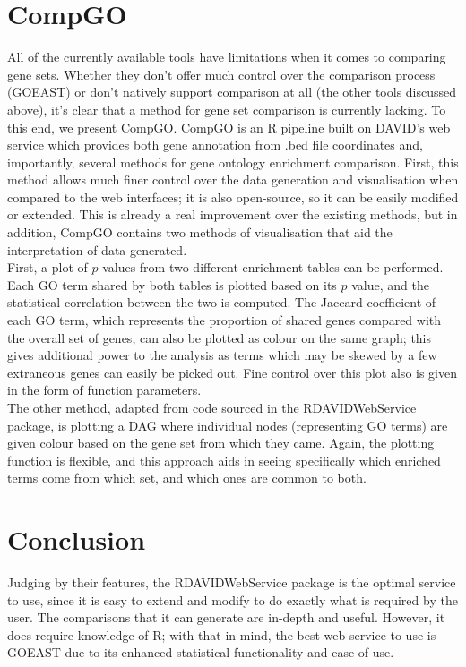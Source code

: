 \documentclass[11pt, oneside]{article}
\begin{document}
\section*{CompGO}
All of the currently available tools have limitations when it comes to comparing gene sets. Whether they don't offer much control over the comparison process (GOEAST) or don't natively support comparison at all (the other tools discussed above), it's clear that a method for gene set comparison is currently lacking. To this end, we present CompGO. CompGO is an R pipeline built on DAVID's web service which provides both gene annotation from .bed file coordinates and, importantly, several methods for gene ontology enrichment comparison. First, this method allows much finer control over the data generation and visualisation when compared to the web interfaces; it is also open-source, so it can be easily modified or extended. This is already a real improvement over the existing methods, but in addition, CompGO contains two methods of visualisation that aid the interpretation of data generated.\\
First, a plot of $p$ values from two different enrichment tables can be performed. Each GO term shared by both tables is plotted based on its $p$ value, and the statistical correlation between the two is computed. The Jaccard coefficient of each GO term, which represents the proportion of shared genes compared with the overall set of genes, can also be plotted as colour on the same graph; this gives additional power to the analysis as terms which may be skewed by a few extraneous genes can easily be picked out. Fine control over this plot also is given in the form of function parameters.\\
The other method, adapted from code sourced in the RDAVIDWebService package, is plotting a DAG where individual nodes (representing GO terms) are given colour based on the gene set from which they came. Again, the plotting function is flexible, and this approach aids in seeing specifically which enriched terms come from which set, and which ones are common to both.

\section*{Conclusion}
Judging by their features, the RDAVIDWebService package is the optimal service to use, since it is easy to extend and modify to do exactly what is required by the user. The comparisons that it can generate are in-depth and useful. However, it does require knowledge of R; with that in mind, the best web service to use is GOEAST due to its enhanced statistical functionality and ease of use.
\end{document}
